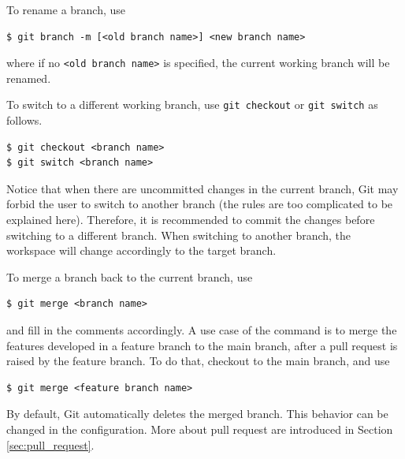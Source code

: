 To rename a branch, use
\begin{lstlisting}
$ git branch -m [<old branch name>] <new branch name>
\end{lstlisting}
where if no \verb|<old branch name>| is specified, the current working branch will be renamed.

To switch to a different working branch, use \verb|git checkout| or \verb|git switch| as follows.
\begin{lstlisting}
$ git checkout <branch name>
$ git switch <branch name>
\end{lstlisting}
Notice that when there are uncommitted changes in the current branch, Git may forbid the user to switch to another branch (the rules are too complicated to be explained here). Therefore, it is recommended to commit the changes before switching to a different branch. When switching to another branch, the workspace will change accordingly to the target branch.

To merge a branch back to the current branch, use
\begin{lstlisting}
$ git merge <branch name>
\end{lstlisting}
and fill in the comments accordingly. A use case of the command is to merge the features developed in a feature branch to the main branch, after a pull request is raised by the feature branch. To do that, checkout to the main branch, and use
\begin{lstlisting}
$ git merge <feature branch name>
\end{lstlisting}
By default, Git automatically deletes the merged branch. This behavior can be changed in the configuration. More about pull request are introduced in Section \ref{sec:pull_request}.

